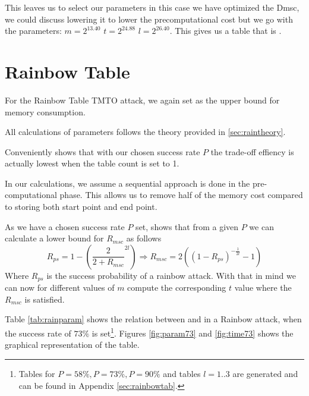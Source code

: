 This leaves us to select our parameters in this case we have optimized the Dmsc, we could discuss lowering it to lower the precomputational cost but we go with the parameters: $m=2^{13.40}$  $t=2^{24.88}$  $l=2^{26.40}$.
This gives us a table that is .

\section{Rainbow Table}
\label{sec:rainbowparam}
For the Rainbow Table TMTO attack, we again set  as the
upper bound for memory consumption.

All calculations of parameters follows the theory provided in
\ref{sec:raintheory}.

Conveniently \cite[Fig.4]{176} shows that with our chosen success rate
$P$ the trade-off effiency is actually lowest when the table count is
set to 1.

In our calculations, we assume a sequential approach is done in the
pre-computational phase. This allows us to remove half of the memory
cost compared to storing both start point and end point.

As we have a chosen success rate $P$ set, \cite[Proposition
29]{176} shows that from a given $P$ we can calculate a lower bound
for $R_{msc}$ as follows
\[R_{ps} = 1 - \left( \frac{2}{2 + R_{msc}}^{2l} \right) \Rightarrow R_{msc} = 2 ((1 - R_{ps})^{-\frac{1}{2l}} - 1)\]
Where $R_{ps}$ is the success probability of a rainbow attack. With
that in mind we can now for different values of $m$ compute the
corresponding $t$ value where the $R_{msc}$ is satisfied.

Table \ref{tab:rainparam} shows the relation between  and
 in a Rainbow attack, when the success rate of $73\%$ is set\footnote{Tables for $P = 58\%, P = 73\%, P = 90\%$ and tables $l=1..3$ are generated and can be
found in Appendix \ref{sec:rainbowtab}.}. Figures \ref{fig:param73}
and \ref{fig:time73} shows the graphical representation of the table.

